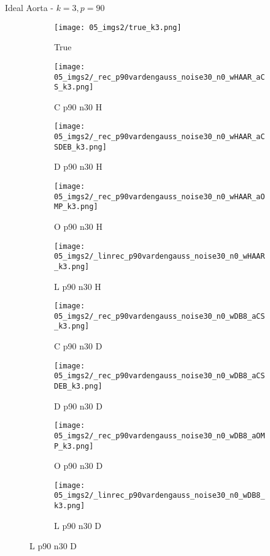 \begin{frame}{Ideal Aorta - $k=3,p=90$}{}
\begin{figure}
\begin{subfigure}{0.1\textwidth}
\texttt{[image: 05\_imgs2/true\_k3.png]}
\caption*{\Tiny True}
\end{subfigure}
\begin{subfigure}{0.1\textwidth}
\texttt{[image: 05\_imgs2/\_rec\_p90vardengauss\_noise30\_n0\_wHAAR\_aCS\_k3.png]}
\caption*{\Tiny C p90 n30 H}
\end{subfigure}
\begin{subfigure}{0.1\textwidth}
\texttt{[image: 05\_imgs2/\_rec\_p90vardengauss\_noise30\_n0\_wHAAR\_aCSDEB\_k3.png]}
\caption*{\Tiny D p90 n30 H}
\end{subfigure}
\begin{subfigure}{0.1\textwidth}
\texttt{[image: 05\_imgs2/\_rec\_p90vardengauss\_noise30\_n0\_wHAAR\_aOMP\_k3.png]}
\caption*{\Tiny O p90 n30 H}
\end{subfigure}
\begin{subfigure}{0.1\textwidth}
\texttt{[image: 05\_imgs2/\_linrec\_p90vardengauss\_noise30\_n0\_wHAAR\_k3.png]}
\caption*{\Tiny L p90 n30 H}
\end{subfigure}
\begin{subfigure}{0.1\textwidth}
\texttt{[image: 05\_imgs2/\_rec\_p90vardengauss\_noise30\_n0\_wDB8\_aCS\_k3.png]}
\caption*{\Tiny C p90 n30 D}
\end{subfigure}
\begin{subfigure}{0.1\textwidth}
\texttt{[image: 05\_imgs2/\_rec\_p90vardengauss\_noise30\_n0\_wDB8\_aCSDEB\_k3.png]}
\caption*{\Tiny D p90 n30 D}
\end{subfigure}
\begin{subfigure}{0.1\textwidth}
\texttt{[image: 05\_imgs2/\_rec\_p90vardengauss\_noise30\_n0\_wDB8\_aOMP\_k3.png]}
\caption*{\Tiny O p90 n30 D}
\end{subfigure}
\begin{subfigure}{0.1\textwidth}
\texttt{[image: 05\_imgs2/\_linrec\_p90vardengauss\_noise30\_n0\_wDB8\_k3.png]}
\caption*{\Tiny L p90 n30 D}
\end{subfigure}
\end{figure}
\end{frame}

